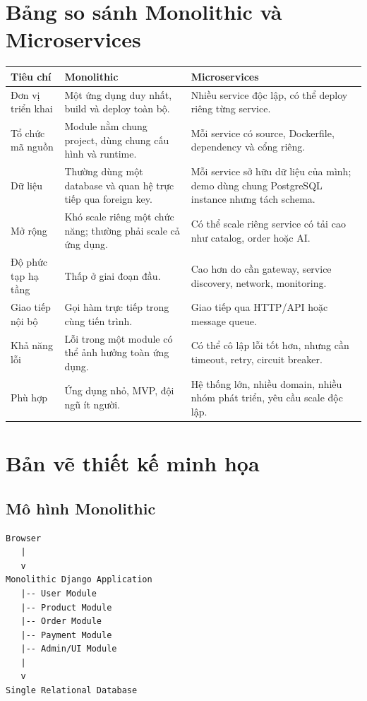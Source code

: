 \documentclass[12pt,a4paper]{report}
\begin{document}
\section{Bảng so sánh Monolithic và Microservices}
\begin{longtable}{p{3.2cm}p{5.3cm}p{5.3cm}}
\toprule
\textbf{Tiêu chí} & \textbf{Monolithic} & \textbf{Microservices} \\
\midrule
Đơn vị triển khai & Một ứng dụng duy nhất, build và deploy toàn bộ. & Nhiều service độc lập, có thể deploy riêng từng service. \\
\midrule
Tổ chức mã nguồn & Module nằm chung project, dùng chung cấu hình và runtime. & Mỗi service có source, Dockerfile, dependency và cổng riêng. \\
\midrule
Dữ liệu & Thường dùng một database và quan hệ trực tiếp qua foreign key. & Mỗi service sở hữu dữ liệu của mình; demo dùng chung PostgreSQL instance nhưng tách schema. \\
\midrule
Mở rộng & Khó scale riêng một chức năng; thường phải scale cả ứng dụng. & Có thể scale riêng service có tải cao như catalog, order hoặc AI. \\
\midrule
Độ phức tạp hạ tầng & Thấp ở giai đoạn đầu. & Cao hơn do cần gateway, service discovery, network, monitoring. \\
\midrule
Giao tiếp nội bộ & Gọi hàm trực tiếp trong cùng tiến trình. & Giao tiếp qua HTTP/API hoặc message queue. \\
\midrule
Khả năng lỗi & Lỗi trong một module có thể ảnh hưởng toàn ứng dụng. & Có thể cô lập lỗi tốt hơn, nhưng cần timeout, retry, circuit breaker. \\
\midrule
Phù hợp & Ứng dụng nhỏ, MVP, đội ngũ ít người. & Hệ thống lớn, nhiều domain, nhiều nhóm phát triển, yêu cầu scale độc lập. \\
\bottomrule
\end{longtable}

\section{Bản vẽ thiết kế minh họa}
\subsection{Mô hình Monolithic}
\begin{lstlisting}[style=code,caption={Thiết kế Monolithic minh họa}]
Browser
   |
   v
Monolithic Django Application
   |-- User Module
   |-- Product Module
   |-- Order Module
   |-- Payment Module
   |-- Admin/UI Module
   |
   v
Single Relational Database
\end{lstlisting}
\end{document}
